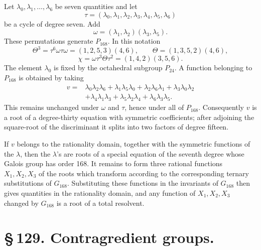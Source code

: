 \documentclass[11pt]{article}
\begin{document}
Let \(\lambda_0,\lambda_1,\ldots,\lambda_6\) be seven quantities and let
\begin{equation}
\tau=(\lambda_0,\lambda_1,\lambda_2,\lambda_3,\lambda_4,\lambda_5,\lambda_6)
\tag{1}
\end{equation}
be a cycle of degree seven. Add
\begin{equation}
\omega=(\lambda_1,\lambda_2)(\lambda_3,\lambda_5).
\tag{2}
\end{equation}
These permutations generate \(P_{168}\). In this notation
\begin{equation}
\Theta^3=\tau^6\omega\tau\omega=(1,2,5,3)(4,6),\qquad
\Theta=(1,3,5,2)(4,6),
\end{equation}
\begin{equation}
\chi=\omega\tau^3\Theta\tau^2=(1,4,2)(3,5,6).
\end{equation}
The element \(\lambda_0\) is fixed by the octahedral subgroup \(P_{24}\). A function belonging to \(P_{168}\) is obtained by taking
\begin{equation}
\begin{aligned}
v={}&\lambda_0\lambda_2\lambda_6+
\lambda_1\lambda_5\lambda_0+
\lambda_2\lambda_6\lambda_1+
\lambda_3\lambda_0\lambda_2\\
&+\lambda_4\lambda_1\lambda_3+
\lambda_5\lambda_2\lambda_4+
\lambda_6\lambda_3\lambda_5.
\end{aligned}
\tag{3}
\end{equation}
This remains unchanged under \(\omega\) and \(\tau\), hence under all of \(P_{168}\). Consequently \(v\) is a root of a degree-thirty equation with symmetric coefficients; after adjoining the square-root of the discriminant it splits into two factors of degree fifteen.

If \(v\) belongs to the rationality domain, together with the symmetric functions of the \(\lambda\), then the \(\lambda\)'s are roots of a special equation of the seventh degree whose Galois group has order 168. It remains to form three rational functions \(X_1,X_2,X_3\) of the roots which transform according to the corresponding ternary substitutions of \(G_{168}\). Substituting these functions in the invariants of \(G_{168}\) then gives quantities in the rationality domain, and any function of \(X_1,X_2,X_3\) changed by \(G_{168}\) is a root of a total resolvent.

\section*{\S\,129. Contragredient groups.}
\end{document}
